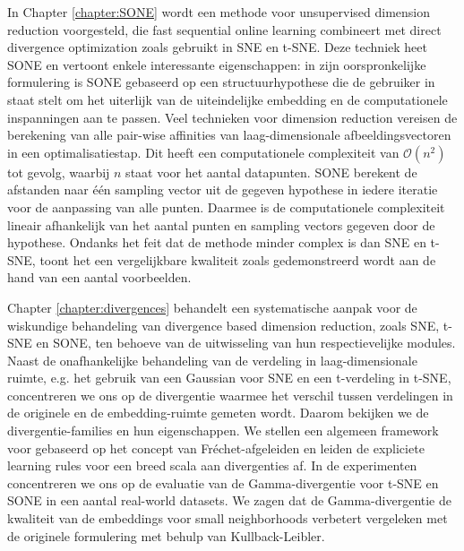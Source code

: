 \documentclass[10pt,fleqn]{phdthesis}%
\newcommand{\C}[1]{\mathcal{#1}}
\begin{document}
In Chapter \ref{chapter:SONE} wordt een methode voor unsupervised dimension reduction voorgesteld, die fast sequential online learning 
combineert met direct divergence optimization zoals gebruikt in \ac{SNE} en \ac{t-SNE}. 
Deze techniek heet \acf{SONE} en vertoont enkele interessante eigenschappen: in zijn oorspronkelijke formulering is \ac{SONE} gebaseerd 
op een structuurhypothese die de gebruiker in staat stelt om het uiterlijk van de uiteindelijke embedding en de computationele inspanningen 
aan te passen. 
Veel technieken voor dimension reduction vereisen de berekening van alle pair-wise affinities van laag-dimensionale afbeeldingsvectoren 
in een optimalisatiestap. 
Dit heeft een computationele complexiteit van $\C{O}(n^2)$ tot gevolg, waarbij $n$ staat voor het aantal datapunten. 
\ac{SONE} berekent de afstanden naar \'e\'en sampling vector uit de gegeven hypothese in iedere iteratie voor de aanpassing van alle punten. 
Daarmee is de computationele complexiteit lineair afhankelijk van het aantal punten en sampling vectors gegeven door de hypothese. 
Ondanks het feit dat de methode minder complex is dan \ac{SNE} en \ac{t-SNE}, toont het een vergelijkbare kwaliteit zoals gedemonstreerd 
wordt aan de hand van een aantal voorbeelden.

Chapter \ref{chapter:divergences} behandelt een systematische aanpak voor de wiskundige behandeling van divergence based dimension reduction, 
zoals \ac{SNE}, \ac{t-SNE} en \ac{SONE}, ten behoeve van de uitwisseling van hun respectievelijke modules. 
Naast de onafhankelijke behandeling van de verdeling in laag-dimensionale ruimte, e.g. het gebruik van een Gaussian voor \ac{SNE} en een 
t-verdeling in \ac{t-SNE}, concentreren we ons op de divergentie waarmee het verschil tussen verdelingen in de originele en de 
embedding-ruimte gemeten wordt. Daarom bekijken we de divergentie-families en hun eigenschappen. 
We stellen een algemeen framework voor gebaseerd op het concept van Fr\'{e}chet-afgeleiden en leiden de expliciete learning rules voor een 
breed scala aan divergenties af. 
In de experimenten concentreren we ons op de evaluatie van de Gamma-divergentie voor \ac{t-SNE} en \ac{SONE} in een aantal real-world datasets. 
We zagen dat de Gamma-divergentie de kwaliteit van de embeddings voor small neighborhoods verbetert vergeleken met de originele 
formulering met behulp van Kullback\hyp{}Leibler.

\cleardoublepage
{}
\printindex
\end{document}

